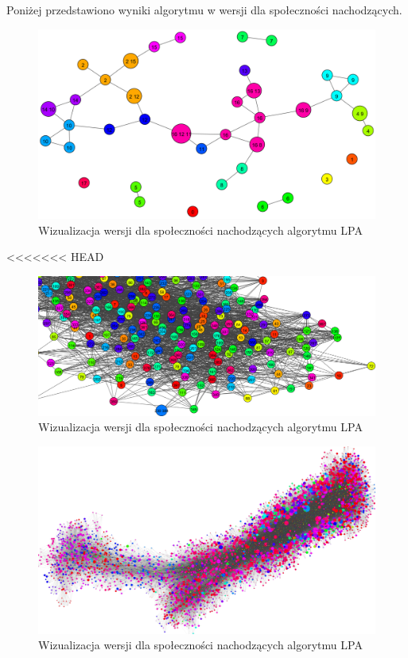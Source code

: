 \documentclass{article}
\begin{document}
Poniżej przedstawiono wyniki algorytmu w wersji dla społeczności nachodzących.

\begin{figure}[H]
\centering
\includegraphics[width=\textwidth]{images/ms-lpa-ol-0.png}
\caption{Wizualizacja wersji dla społeczności nachodzących algorytmu LPA}
\end{figure}
<<<<<<< HEAD

\begin{figure}[H]
\centering
\includegraphics[width=\textwidth]{images/ms-lpa-ol-2.png}
\caption{Wizualizacja wersji dla społeczności nachodzących algorytmu LPA}
\end{figure}

\begin{figure}[H]
\centering
\includegraphics[width=\textwidth]{images/ms-ol-nba.png}
\caption{Wizualizacja wersji dla społeczności nachodzących algorytmu LPA}
\end{figure}
\end{document}
